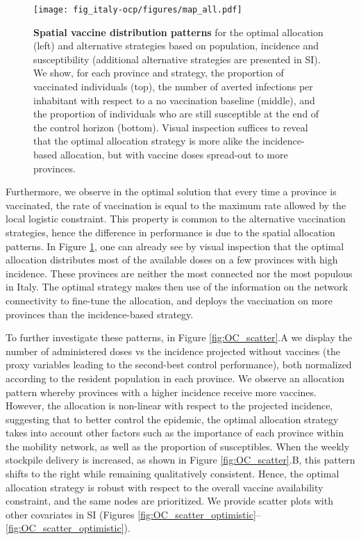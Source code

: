 \begin{figure}[!ht]
    \centering
    \texttt{[image: fig\_italy-ocp/figures/map\_all.pdf]}
    \caption[Spatial  vaccine distribution patterns]{\textbf{Spatial  vaccine distribution patterns} for the optimal allocation (left) and alternative strategies based on population, incidence and susceptibility (additional alternative strategies are presented in SI). We show, for each province and strategy, the proportion of vaccinated individuals (top), the number of averted infections per inhabitant with respect to a no vaccination baseline (middle), and the proportion of individuals who are still susceptible at the end of the control horizon (bottom). Visual inspection suffices to reveal that the optimal allocation strategy is more alike the incidence-based allocation, but with vaccine doses spread-out to more provinces.}
    \label{fig:OC_multimap}
\end{figure}

Furthermore, we observe in the optimal solution that every time a province is vaccinated, the rate of vaccination is equal to the maximum rate allowed by the local logistic constraint. This property is common to the alternative vaccination strategies, hence the difference in performance is due to the spatial allocation patterns.%
In Figure \ref{fig:OC_multimap}, one can already see by visual inspection that the optimal allocation distributes most of the available doses on a few provinces with high incidence. These provinces are neither the most connected nor the most populous in Italy. The optimal strategy makes then use of the information on the network connectivity to fine-tune the allocation, and deploys the vaccination on more provinces than the incidence-based strategy. %

To further investigate these patterns, in Figure \ref{fig:OC_scatter}.A we display the number of administered doses vs the incidence projected without vaccines (the proxy variables leading to the second-best control performance), both normalized according to the resident population in each province. We observe an allocation pattern whereby provinces with a higher incidence receive more vaccines. However, the allocation is non-linear with respect to the projected incidence, suggesting that to better control the epidemic, the optimal allocation strategy takes into account other factors such as the importance of each province within the mobility network, as well as the proportion of susceptibles. When the weekly stockpile delivery is increased, as shown in Figure \ref{fig:OC_scatter}.B, this pattern shifts to the right while remaining qualitatively consistent. Hence, the optimal allocation strategy is robust with respect to the overall vaccine availability constraint, and the same nodes are prioritized. We provide scatter plots with other covariates in SI (Figures \ref{fig:OC_scatter_optimistic}--\ref{fig:OC_scatter_optimistic}). 

